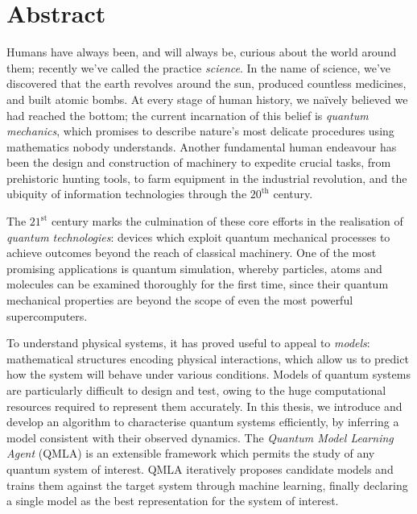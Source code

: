 \chapter*{Abstract}

Humans have always been, and will always be, curious about the world around them;
    recently we've called the practice \emph{science}. 
In the name of science, we've discovered that the earth revolves around the sun, 
    produced countless medicines, and built atomic bombs.
At every stage of human history, we na\"ively believed we had reached the bottom;
    the current incarnation of this belief is \emph{quantum mechanics},
    which promises to describe nature's most delicate procedures using mathematics nobody understands. 
Another fundamental human endeavour has been the design and construction of machinery to expedite crucial tasks, 
    from prehistoric hunting tools, to farm equipment in the industrial revolution, 
    and the ubiquity of information technologies through  the $20^{\textrm{th}}$ century. 

\par 
The $21^{\textrm{st}}$ century marks the culmination of these core efforts in the realisation of \emph{quantum technologies}:
    devices which exploit quantum mechanical processes to achieve outcomes beyond the reach of classical machinery.
One of the most promising applications is quantum simulation, 
    whereby particles, atoms and molecules can be examined thoroughly for the first time, 
    since their quantum mechanical properties are beyond the scope of even the most powerful supercomputers. 
\par 

To understand physical systems, it has proved useful to appeal to \emph{models}:
    mathematical structures encoding physical interactions,
    which allow us to predict how the system will behave under various conditions. 
Models of quantum systems are particularly difficult to design and test, 
    owing to the huge computational resources required to represent them accurately.
In this thesis, we introduce and develop an algorithm to characterise quantum systems efficiently, 
    by inferring a model consistent with their observed dynamics.
The \emph{Quantum Model Learning Agent} (QMLA) is an extensible framework which permits 
    the study of any quantum system of interest.
QMLA iteratively proposes candidate models and trains them against the target system through machine learning, 
    finally declaring a single model as the best representation for the system of interest.  
\par 

